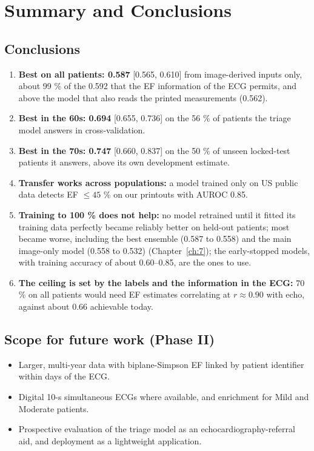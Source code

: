 \chapter{Summary and Conclusions}\label{ch:8}

\section{Conclusions}\label{sec:8.1}

\begin{enumerate}
  \item \textbf{Best on all patients: 0.587} [0.565, 0.610] from image-derived inputs only, about 99 \% of the 0.592 that the EF information of the ECG permits, and above the model that also reads the printed measurements (0.562).
  \item \textbf{Best in the 60s: 0.694} [0.655, 0.736] on the 56 \% of patients the triage model answers in cross-validation.
  \item \textbf{Best in the 70s: 0.747} [0.660, 0.837] on the 50 \% of unseen locked-test patients it answers, above its own development estimate.
  \item \textbf{Transfer works across populations:} a model trained only on US public data detects EF $\le45$ \% on our printouts with AUROC 0.85.
  \item \textbf{Training to 100 \% does not help:} no model retrained until it fitted its training data perfectly became reliably better on held-out patients; most became worse, including the best ensemble (0.587 to 0.558) and the main image-only model (0.558 to 0.532) (Chapter~\ref{ch:7}); the early-stopped models, with training accuracy of about 0.60--0.85, are the ones to use.
  \item \textbf{The ceiling is set by the labels and the information in the ECG:} 70 \% on all patients would need EF estimates correlating at $r\approx0.90$ with echo, against about 0.66 achievable today.
\end{enumerate}
\section{Scope for future work (Phase II)}\label{sec:8.2}

\begin{itemize}
  \item Larger, multi-year data with biplane-Simpson EF linked by patient identifier within days of the ECG.
  \item Digital 10-s simultaneous ECGs where available, and enrichment for Mild and Moderate patients.
  \item Prospective evaluation of the triage model as an echocardiography-referral aid, and deployment as a lightweight application.
\end{itemize}
